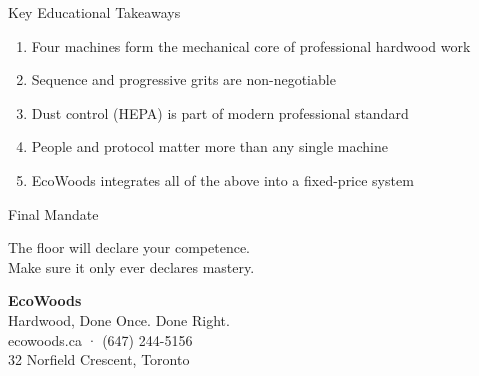 \documentclass[aspectratio=169,10pt]{beamer}
\begin{document}
\begin{frame}{Key Educational Takeaways}
\begin{enumerate}
  \item Four machines form the mechanical core of professional hardwood work
  \item Sequence and progressive grits are non-negotiable
  \item Dust control (HEPA) is part of modern professional standard
  \item People and protocol matter more than any single machine
  \item EcoWoods integrates all of the above into a fixed-price system
\end{enumerate}
\end{frame}

\begin{frame}{Final Mandate}
\begin{center}
\Huge
The floor will declare your competence.\\[0.35em]
{\large Make sure it only ever declares mastery.}
\end{center}
\vspace{0.5cm}
\begin{center}
{\LARGE\textbf{EcoWoods}}\\[0.1em]
Hardwood, Done Once. Done Right.\\[0.22em]
{\small ecowoods.ca \quad · \quad (647) 244-5156}\\[0.08em]
{\footnotesize 32 Norfield Crescent, Toronto}
\end{center}
\end{frame}
\end{document}
